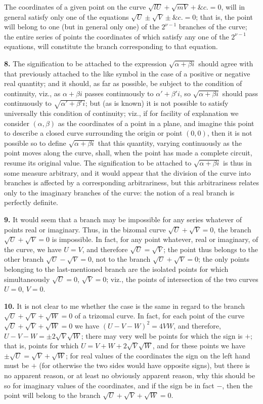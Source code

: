 \documentclass[11pt,a4paper]{article}
\theoremstyle{definition}
\begin{document}
The coordinates of a given point on the curve $\sqrt{lU}+\sqrt{mV}+\&c.=0$, will in general satisfy only one of the equations $\sqrt{U}\pm\sqrt{V}\pm\&c.=0$; that is, the point will belong to one (but in general only one) of the $2^{\nu-1}$ branches of the curve; the entire series of points the coordinates of which satisfy any one of the $2^{\nu-1}$ equations, will constitute the branch corresponding to that equation.

\noindent\textbf{8.} The signification to be attached to the expression $\sqrt{\alpha+\beta i}$ should agree with that previously attached to the like symbol in the case of a positive or negative real quantity; and it should, as far as possible, be subject to the condition of continuity, viz., as $\alpha+\beta i$ passes continuously to $\alpha'+\beta' i$, so $\sqrt{\alpha+\beta i}$ should pass continuously to $\sqrt{\alpha'+\beta' i}$; but (as is known) it is not possible to satisfy universally this condition of continuity; viz., if for facility of explanation we consider $(\alpha,\beta)$ as the coordinates of a point in a plane, and imagine this point to describe a closed curve surrounding the origin or point $(0,0)$, then it is not possible so to define $\sqrt{\alpha+\beta i}$ that this quantity, varying continuously as the point moves along the curve, shall, when the point has made a complete circuit, resume its original value. The signification to be attached to $\sqrt{\alpha+\beta i}$ is thus in some measure arbitrary, and it would appear that the division of the curve into branches is affected by a corresponding arbitrariness, but this arbitrariness relates only to the imaginary branches of the curve: the notion of a real branch is perfectly definite.

\noindent\textbf{9.} It would seem that a branch may be impossible for any series whatever of points real or imaginary. Thus, in the bizomal curve $\sqrt{U}+\sqrt{V}=0$, the branch $\sqrt{U}+\sqrt{V}=0$ is impossible. In fact, for any point whatever, real or imaginary, of the curve, we have $U=V$, and therefore $\sqrt{U}=\sqrt{V}$; the point thus belongs to the other branch $\sqrt{U}-\sqrt{V}=0$, not to the branch $\sqrt{U}+\sqrt{V}=0$; the only points belonging to the last-mentioned branch are the isolated points for which simultaneously $\sqrt{U}=0$, $\sqrt{V}=0$; viz., the points of intersection of the two curves $U=0$, $V=0$.

\noindent\textbf{10.} It is not clear to me whether the case is the same in regard to the branch $\sqrt{U}+\sqrt{V}+\sqrt{W}=0$ of a trizomal curve. In fact, for each point of the curve $\sqrt{U}+\sqrt{V}+\sqrt{W}=0$ we have $(U-V-W)^2=4VW$, and therefore, $U-V-W=\pm 2\sqrt{V}\sqrt{W}$; there may very well be points for which the sign is $+$; that is, points for which $U=V+W+2\sqrt{V}\sqrt{W}$, and for these points we have $\pm\sqrt{U}=\sqrt{V}+\sqrt{W}$; for real values of the coordinates the sign on the left hand must be $+$ (for otherwise the two sides would have opposite signs), but there is no apparent reason, or at least no obviously apparent reason, why this should be so for imaginary values of the coordinates, and if the sign be in fact $-$, then the point will belong to the branch $\sqrt{U}+\sqrt{V}+\sqrt{W}=0$.
\end{document}
